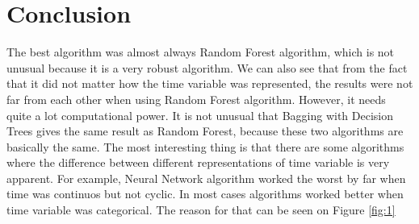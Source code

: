 \documentclass[12pt]{article}
\begin{document}
	
	\section{Conclusion}
	The best algorithm was almost always Random Forest algorithm, which is not unusual because it is a very robust algorithm. We can also see that from the fact that it did not matter how the time variable was represented, the results were not far from each other when using Random Forest algorithm. However, it needs quite a lot computational power. It is not unusual that Bagging with Decision Trees gives the same result as Random Forest, because these two algorithms are basically the same. The most interesting thing is that there are some algorithms where the difference between different representations of time variable is very apparent. For example, Neural Network algorithm worked the worst by far when time was continuos but not cyclic. In most cases algorithms worked better when time variable was categorical. The reason for that can be seen on Figure \ref{fig:1}
	
	
	
	
	
	
\end{document}

